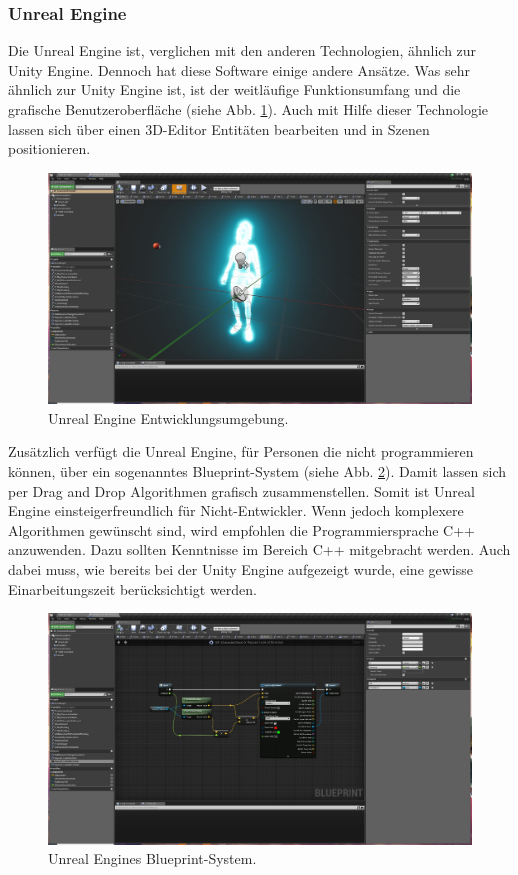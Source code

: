 \documentclass[a4paper,12pt,oneside]{article}
\begin{document}
      \subsubsection{Unreal Engine}
        Die Unreal Engine ist, verglichen mit den anderen Technologien, ähnlich zur 
        Unity Engine. Dennoch hat diese Software einige andere Ansätze. Was sehr ähnlich
        zur Unity Engine ist, ist der weitläufige Funktionsumfang und die grafische 
        Benutzeroberfläche (siehe Abb. \ref{fig:unreal1}). 
        Auch mit Hilfe dieser Technologie lassen sich über 
        einen 3D-Editor Entitäten bearbeiten und in Szenen positionieren.
        \begin{figure}[t]
          \centering
          \includegraphics[scale=0.35]{img/unreal1.png}
          \caption{Unreal Engine Entwicklungsumgebung.}
          \label{fig:unreal1}
        \end{figure}
        Zusätzlich verfügt die Unreal Engine,
        für Personen die nicht programmieren können, über ein sogenanntes Blueprint-System
        (siehe Abb. \ref{fig:unreal2}).
        Damit lassen sich per Drag and Drop Algorithmen grafisch zusammenstellen. Somit
        ist Unreal Engine einsteigerfreundlich für Nicht-Entwickler.
        Wenn jedoch komplexere Algorithmen gewünscht sind, wird empfohlen die 
        Programmiersprache C++ anzuwenden. Dazu sollten Kenntnisse im Bereich C++
        mitgebracht werden. Auch dabei muss, wie bereits bei der Unity Engine aufgezeigt
        wurde, eine gewisse Einarbeitungszeit berücksichtigt werden. \\
        \begin{figure}[h]
          \centering
          \includegraphics[scale=0.35]{img/unreal2.png}
          \caption{Unreal Engines Blueprint-System.}
          \label{fig:unreal2}
        \end{figure}
\end{document}
